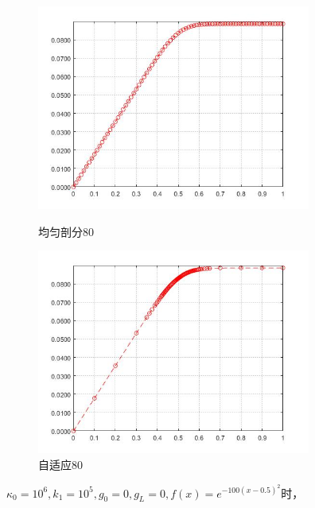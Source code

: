 \documentclass[12pt,fontset=mac]{ctexart}
\begin{document}
\begin{figure}[H]
	\centering
	\begin{minipage}[t]{0.48\textwidth}
		\centering
		\includegraphics[width=9cm]{方程一，均匀剖分80.jpg}
		\caption{均匀剖分80}
	\end{minipage}
	\begin{minipage}[t]{0.48\textwidth}
		\centering
		\includegraphics[width=9cm]{方程一，自适应80.jpg}
		\caption{自适应80}
	\end{minipage}
\end{figure}
$\kappa_0=10^6,k_1=10^5,g_0=0,g_L=0,f(x)=e^{-100(x-0.5)^2}$时，\\
\end{document}
